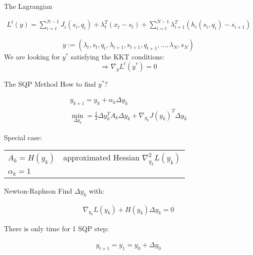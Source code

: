 \begin{frame}{The Lagrangian}
\begin{block}{ }
\begin{align*}
  L^{t}(y) = \sum_{i=t}^{N-1} J_{i}(s_{i},q_{i})
  + \lambda_{t}^{T}(x_{t} - s_{t})
  + \sum_{i=t}^{N-1} \lambda_{i+1}^{T} (h_i (s_i ,q_i ) - s_{i+1}) 
\end{align*}
\vspace{.1ex}
\end{block}
\vspace{1ex}
$$ y := (\lambda_{t},s_{t},q_{t},\lambda_{t+1},s_{t+1},q_{t+1}, ...,\lambda_{N},s_{N}) $$
\vspace{1ex}
We are looking for $y^*$ satisfying the KKT conditions: \\

\[ \Rightarrow \nabla_{y} L^{t}(y^*)  = 0 \]

\end{frame}

\begin{frame}{The SQP Method}
How to find $y^*$?
\begin{block}{ }
\begin{gather*}
y_{k+1} = y_{k} + \alpha_{k} \Delta y_{k}  \\ 
\min_{\Delta y_k} = \frac{1}{2} \Delta y_k^T A_k \Delta y_k + \nabla_{y_k} J(y_k)^T \Delta y_k
\end{gather*} \vspace{.1ex}
\end{block}
\vspace{1ex}
Special case: \\
\vspace{1ex}
\begin{tabular}{l l}
$ A_{k} = H(y_k)$ & approximated Hessian $\nabla^{2}_{y_k} L(y_k)$ \vspace{1ex} \\
$\alpha_k = 1$ & 
\end{tabular}
\end{frame}

\begin{frame}{Newton-Raphson}
Find $\Delta y_k$ with:
\begin{block}{}
\begin{gather*}
\nabla_{y_k} L(y_{k}) + H(y_{k}) \Delta y_{k} = 0
\end{gather*} \vspace{.1ex}
\end{block}
There is only time for 1 SQP step:
\begin{block}{ }
\begin{gather*}
y_{t+1} = y_1 = y_0 + \Delta y_0 \\
\end{gather*}
\end{block}
\end{frame}

